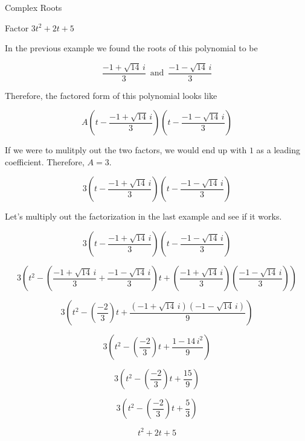 \documentclass{ximera}
\begin{document}
\begin{example} Complex Roots

Factor $3 t^2 + 2 t + 5$


In the previous example we found the roots of this polynomial to be


\[     \frac{-1 + \sqrt{14} \, i}{3}   \,  \text{ and } \, \frac{-1 - \sqrt{14} \, i}{3}         \]

Therefore, the factored form of this polynomial looks like


\[     A \left(t - \frac{-1 + \sqrt{14} \, i}{3} \right) \left(t -  \frac{-1 - \sqrt{14} \, i}{3} \right)        \]


If we were to mulitply out the two factors, we would end up with $1$ as a leading coefficient.  Therefore, $A = 3$.

\[     3 \left(t - \frac{-1 + \sqrt{14} \, i}{3} \right) \left(t -  \frac{-1 - \sqrt{14} \, i}{3} \right)        \]

\end{example}





Let's multiply out the factorization in the last example and see if it works.



\[     3 \left(t - \frac{-1 + \sqrt{14} \, i}{3} \right) \left(t -  \frac{-1 - \sqrt{14} \, i}{3} \right)        \]


\[     3 \left(  t^2 - \left(\frac{-1 + \sqrt{14} \, i}{3} + \frac{-1 - \sqrt{14} \, i}{3}\right) t + \left(\frac{-1 + \sqrt{14} \, i}{3}\right) \left(\frac{-1 - \sqrt{14} \, i}{3}\right)      \right)       \]



\[     3 \left(  t^2 - \left(\frac{-2}{3} \right) t + \frac{(-1 + \sqrt{14} \, i)(-1 - \sqrt{14} \, i)}{9}\right)     \]



\[     3 \left(  t^2 - \left(\frac{-2}{3} \right) t + \frac{1 - 14 \, i^2}{9}\right)     \]


\[     3 \left(  t^2 - \left(\frac{-2}{3} \right) t + \frac{15}{9} \right)     \]


\[     3 \left(  t^2 - \left(\frac{-2}{3} \right) t + \frac{5}{3}\right)     \]



\[      t^2 + 2t + 5   \]
\end{document}

